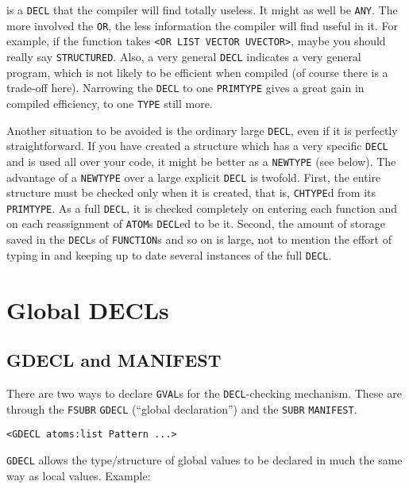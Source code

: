 \documentclass[a4paper]{scrbook}
\begin{document}
is a \texttt{DECL} that the compiler will find totally useless. It might as well be \texttt{ANY}. The more involved the
\texttt{OR}, the less information the compiler will find useful in it. For example, if the function takes
\texttt{\textless{}OR\ LIST\ VECTOR\ UVECTOR\textgreater{}}, maybe you should really say \texttt{STRUCTURED}. Also, a very
general \texttt{DECL} indicates a very general program, which is not likely to be efficient when compiled (of course there
is a trade-off here). Narrowing the \texttt{DECL} to one \texttt{PRIMTYPE} gives a great gain in compiled efficiency, to
one \texttt{TYPE} still more.

Another situation to be avoided is the ordinary large \texttt{DECL}, even if it is perfectly straightforward. If you have
created a structure which has a very specific \texttt{DECL} and is used all over your code, it might be better as a
\texttt{NEWTYPE} (see below). The advantage of a \texttt{NEWTYPE} over a large explicit \texttt{DECL} is twofold. First,
the entire structure must be checked only when it is created, that is, \texttt{CHTYPE}d from its \texttt{PRIMTYPE}. As a
full \texttt{DECL}, it is checked completely on entering each function and on each reassignment of \texttt{ATOM}s
\texttt{DECL}ed to be it. Second, the amount of storage saved in the \texttt{DECL}s of \texttt{FUNCTION}s and so on is
large, not to mention the effort of typing in and keeping up to date several instances of the full \texttt{DECL}.

\section{Global DECLs}\label{global-decls}

\subsection{GDECL and MANIFEST}\label{gdecl-and-manifest}

There are two ways to declare \texttt{GVAL}s for the \texttt{DECL}-checking mechanism. These are through the
\texttt{FSUBR} \texttt{GDECL}  (``global declaration'') and the
\texttt{SUBR} \texttt{MANIFEST}.

\begin{verbatim}
<GDECL atoms:list Pattern ...>
\end{verbatim}

\texttt{GDECL} allows the type/structure of global values to be declared in much the same way as local values. Example:
\end{document}
